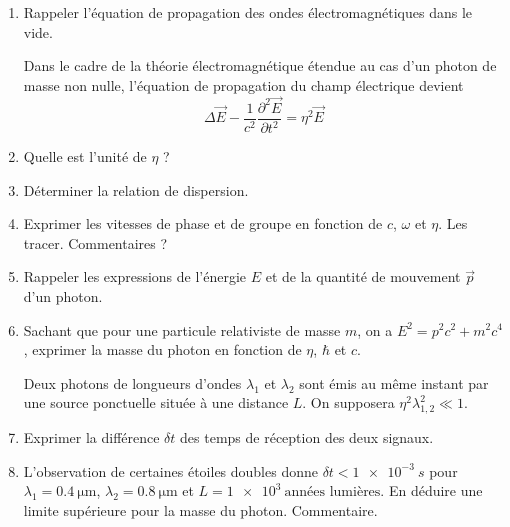 \begin{enumerate}
	\item Rappeler l'équation de propagation des ondes électromagnétiques dans le vide.
	
	Dans le cadre de la théorie électromagnétique étendue au cas d'un photon de masse non nulle, l'équation de propagation du champ électrique devient $$\Delta \vec{E} - \frac{1}{c^2} \frac{\partial^2 \vec{E}}{\partial t^2} = \eta^2 \vec{E}$$

	\item Quelle est l'unité de $\eta$ ?
	\item Déterminer la relation de dispersion.
	\item Exprimer les vitesses de phase et de groupe en fonction de $c$, $\omega$ et $\eta$. Les tracer. Commentaires ?
	\item Rappeler les expressions de l'énergie $E$ et de la quantité de mouvement $\vec{p}$ d'un photon.
	\item Sachant que pour une particule relativiste de masse $m$, on a $E^2 = p^2 c^2 + m^2 c^4$, exprimer la masse du photon en fonction de $\eta$, $\hbar$ et $c$.
	
	Deux photons de longueurs d'ondes $\lambda_1$ et $\lambda_2$ sont émis au même instant par une source ponctuelle située à une distance $L$. On supposera $\eta^2 \lambda_{1, 2}^2 \ll 1$.
	
	\item Exprimer la différence $\delta t$ des temps de réception des deux signaux.
	
	\item L'observation de certaines étoiles doubles donne $\delta t < \SI{1e-3}{s}$ pour $\lambda_1 = \SI{0.4}{\micro\meter}$, $\lambda_2 = \SI{0.8}{\micro\meter}$ et $L = \SI{1e3}{\textrm{années lumières}}$. En déduire une limite supérieure pour la masse du photon. Commentaire.
	
\end{enumerate}



